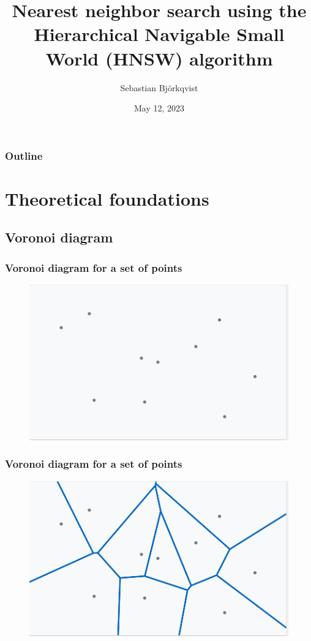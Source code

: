 \documentclass{beamer}
\title{Nearest neighbor search using the Hierarchical Navigable Small World (HNSW) algorithm}
\author{Sebastian Bj{\"o}rkqvist}
\institute{Lead AI Developer, IPRally}
\date[12.05.2023]{May 12, 2023}
\begin{document}

\frame{\titlepage}


\begin{frame}
\frametitle{Outline}
  \tableofcontents
\end{frame}
\section{Theoretical foundations}
\subsection{Voronoi diagram}
  \begin{frame}
    \frametitle{Voronoi diagram for a set of points}  
  \begin{figure}[original_points]
    \vspace*{-0.1cm}
  	\includegraphics[scale=0.25]{original_points} 	
  \end{figure} 
  \end{frame}
  \begin{frame}
    \frametitle{Voronoi diagram for a set of points}  
  \begin{figure}[voronoi_diagram]
    \vspace*{-0.1cm}
  	\includegraphics[scale=0.3]{voronoi_diagram} 	
  \end{figure} 
  \end{frame} 
\end{document}

